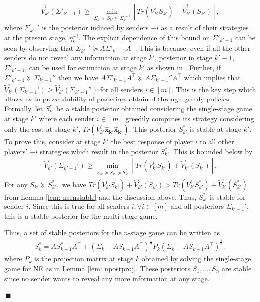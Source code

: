 \documentclass[12pt,journal,onecolumn]{IEEEtran}
\newenvironment{Proof}[1]{\medskip\par\noindent{\bf Proof:\,}\,#1}{{\mbox{\,$\blacksquare$}\par}}
\begin{document}
\begin{Proof}
\begin{align}
    \tilde{V}_{k'}^i(\Sigma'_{k'-1})\geq \min_{\Sigma_{k'}\succeq S_{k'}\succeq \Sigma_{k'}^{'-i}} [Tr(V^i_{k'}S_{k'})+\tilde{V}_{k'}^i(S_{k'})], 
\end{align}
where $\Sigma_{k'}^{'-i}$ is the posterior induced by senders $-i$ as a result of their strategies at the present stage, $\eta_{k'}^{-i}$. The explicit dependence of this bound on $\Sigma'_{k'-1}$ can be seen by observing that $\Sigma_{k'}^{'-i}\succeq A\Sigma'_{k'-1}A^\top$. This is because, even if all the other senders do not reveal any information at stage $k'$, posterior in stage $k'-1$, $\Sigma'_{k'-1}$, can be used for estimation at stage $k'$ as shown in \cite{sayin2019hierarchical}. Further, if $\Sigma'_{k'-1}\succeq \Sigma_{k'-1}''$ then we have $A\Sigma'_{k'-1}A^\top\succeq A\Sigma_{k'-1}''A^\top$ which implies that $\tilde{V}_{k'}^i(\Sigma_{k'-1}')\geq \tilde{V}_{k'}^i(\Sigma_{k'-1}'')$ for all senders $i\in[m]$. This is the key step which allows us to prove stability of posteriors obtained through greedy policies. Formally, let $S_{k'}^*$ be a stable posterior obtained considering the single-stage game at stage $k'$ where each sender $i\in[m]$ greedily computes its strategy considering only the cost at stage $k'$,  $Tr(V_{k'}^i\boldsymbol{\hat{x}_{k'}}\boldsymbol{\hat{x}_{k'}^\top})$. This posterior $S_{k'}^*$ is stable at stage $k'$. To prove this, consider at stage $k'$ the best response of player $i$ to all other players' $-i$ strategies which result in the posterior $S_{k'}^*$. This is bounded below by
\begin{align*}
    \tilde{V}^i_{k'}(\Sigma_{k'-1}')\geq \min_{\Sigma_{k'}\succeq S_{k'}\succeq S_{k'}^*} [Tr(V^i_{k'}S_{k'})+\tilde{V}_{k'}^i(S_{k'})].
\end{align*}
For any $S_{k'}\succeq S_{k'}^*,$ we have $ Tr(V^i_{k'}S_{k'})+\tilde{V}_{k'}^i(S_{k'})>Tr(V^i_{k'}S_{k'}^*)+\tilde{V}_{k'}^i(S_{k'}^*)$ from Lemma \ref{lem: nsenstable} and the discussion above. Thus, $S_{k'}^*$ is stable for sender $i$. Since this is true for all senders $i,\forall i\in[m]$ and all posteriors $\Sigma_{k'-1}'$, this is a stable posterior for the multi-stage game.

 Thus, a set of stable posteriors for the $n$-stage game can be written as
\begin{align*}
S^*_k=AS_{k-1}^*A^\top+(\Sigma_k-AS_{k-1}A^\top)^{\frac{1}{2}}P_k(\Sigma_k-AS_{k-1}A^\top)^{\frac{1}{2}},
\end{align*}
where $P_k$ is the projection matrix at stage $k$ obtained by solving the single-stage game for NE as in Lemma \ref{lem: npostproj}. These posteriors $S_1,\hdots,S_n$ are stable since no sender wants to reveal any more information at any stage.
\end{Proof}
\end{document}
